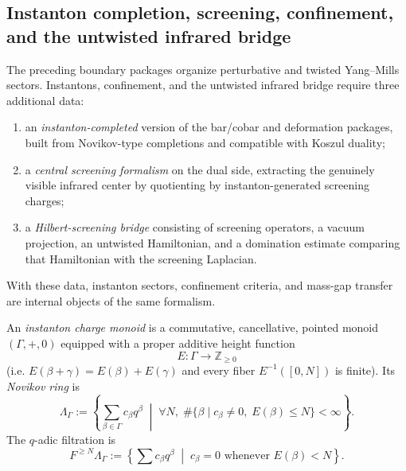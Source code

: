 \subsection{Instanton completion, screening, confinement, and the untwisted infrared bridge}

\begin{summary}
The preceding boundary packages organize perturbative and twisted Yang--Mills sectors.
Instantons, confinement, and the untwisted infrared bridge require three additional data:
\begin{enumerate}[label=(\roman*)]
\item an \emph{instanton-completed} version of the bar/cobar and deformation packages, built from
Novikov-type completions and compatible with Koszul duality;
\item a \emph{central screening formalism} on the dual side, extracting the genuinely visible
infrared center by quotienting by instanton-generated screening charges;
\item a \emph{Hilbert-screening bridge} consisting of screening operators, a vacuum projection,
an untwisted Hamiltonian, and a domination estimate comparing that Hamiltonian with the screening Laplacian.
\end{enumerate}
With these data, instanton sectors, confinement criteria, and mass-gap transfer are internal
objects of the same formalism.
\end{summary}

\begin{definition}
An \emph{instanton charge monoid} is a commutative, cancellative, pointed monoid
$(\Gamma,+,0)$ equipped with a proper additive height function
\[
E\colon \Gamma \longrightarrow \mathbb Z_{\ge 0}
\]
(i.e. $E(\beta+\gamma)=E(\beta)+E(\gamma)$ and every fiber $E^{-1}([0,N])$ is finite).
Its \emph{Novikov ring} is
\[
\Lambda_{\Gamma}
:=
\left\{\sum_{\beta\in\Gamma} c_{\beta} q^{\beta}
\;\middle|\;
\forall N,\; \#\{\beta\mid c_{\beta}\neq 0,\;E(\beta)\le N\}<\infty
\right\}.
\]
The $q$-adic filtration is
\[
F^{\ge N}\Lambda_{\Gamma}
:=
\left\{\sum c_{\beta}q^{\beta}\;\middle|\; c_{\beta}=0\text{ whenever }E(\beta)<N\right\}.
\]
\end{definition}

